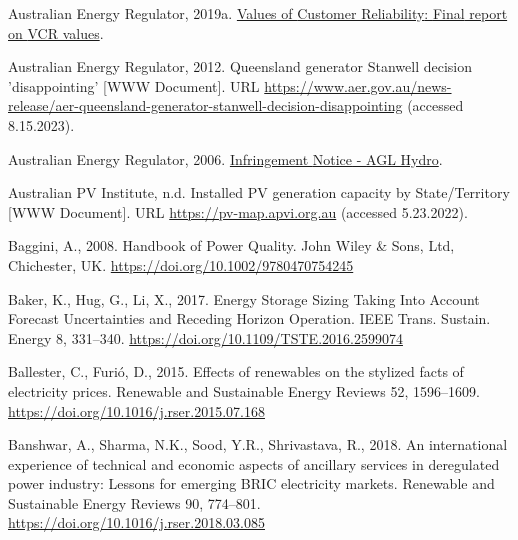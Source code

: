 \documentclass[12pt,a4paper,]{report}
\newlength{\cslhangindent}
\newenvironment{CSLReferences}[2] %
 {%
  \setlength{\parindent}{0pt}
  \ifodd #1 \everypar{\setlength{\hangindent}{\cslhangindent}}\ignorespaces\fi
  \ifnum #2 > 0
  \setlength{\parskip}{#2\baselineskip}
  \fi
 }%
 {}
\begin{document}
\begin{CSLReferences}{1}{0}
\leavevmode{}%
Australian Energy Regulator, 2019a.
\href{https://www.aer.gov.au/system/files/AER\%20-\%20Values\%20of\%20Customer\%20Reliability\%20Review\%20-\%20Final\%20Report\%20-\%20December\%202019.pdf}{Values
of {Customer Reliability}: {Final} report on {VCR} values}.

\leavevmode{}%
Australian Energy Regulator, 2012. Queensland generator {Stanwell}
decision 'disappointing' {[}WWW Document{]}. URL
\url{https://www.aer.gov.au/news-release/aer-queensland-generator-stanwell-decision-disappointing}
(accessed 8.15.2023).

\leavevmode{}%
Australian Energy Regulator, 2006.
\href{https://www.aer.gov.au/system/files/AGL\%20Infringement\%20Notice.pdf}{Infringement
{Notice} - {AGL Hydro}}.

\leavevmode{}%
Australian PV Institute, n.d. Installed {PV} generation capacity by
{State}/{Territory} {[}WWW Document{]}. URL
\url{https://pv-map.apvi.org.au} (accessed 5.23.2022).

\leavevmode{}%
Baggini, A., 2008. Handbook of {Power Quality}. {John Wiley \& Sons,
Ltd}, {Chichester, UK}. \url{https://doi.org/10.1002/9780470754245}

\leavevmode{}%
Baker, K., Hug, G., Li, X., 2017. Energy {Storage Sizing Taking Into
Account Forecast Uncertainties} and {Receding Horizon Operation}. IEEE
Trans. Sustain. Energy 8, 331--340.
\url{https://doi.org/10.1109/TSTE.2016.2599074}

\leavevmode{}%
Ballester, C., Furió, D., 2015. Effects of renewables on the stylized
facts of electricity prices. Renewable and Sustainable Energy Reviews
52, 1596--1609. \url{https://doi.org/10.1016/j.rser.2015.07.168}

\leavevmode{}%
Banshwar, A., Sharma, N.K., Sood, Y.R., Shrivastava, R., 2018. An
international experience of technical and economic aspects of ancillary
services in deregulated power industry: {Lessons} for emerging {BRIC}
electricity markets. Renewable and Sustainable Energy Reviews 90,
774--801. \url{https://doi.org/10.1016/j.rser.2018.03.085}


\end{CSLReferences}
\end{document}
